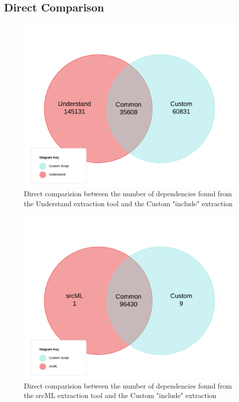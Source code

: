 \documentclass[12pt, dvipsnames, a4paper]{article}
\begin{document}
\subsection{Direct Comparison}

\begin{figure}[H]
	\center
	\includegraphics[width = 450pt]{assets/UnderstandCustom.jpeg}
	\caption{Direct comparision between the number of dependencies found from the Understand extraction tool and the Custom "include" extraction}
\end{figure}

\begin{figure}[H]
	\center
	\includegraphics[width = 450pt]{assets/srcMLCustom.jpeg}
	\caption{Direct comparision between the number of dependencies found from the srcML extraction tool and the Custom "include" extraction}
\end{figure}
\end{document}
